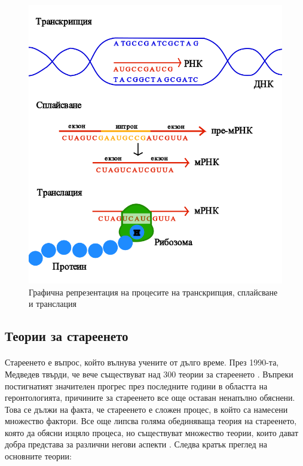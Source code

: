 \documentclass[pdftex,cyrillic,14pt,a4page,twoside]{extreport}
\begin{document}
\begin{figure}[h]
  \centering
  \includegraphics[width=12cm]{figures/transcription_splicing_translation}
  \caption {Графична репрезентация на процесите на транскрипция, сплайсване и транслация}
  \label{fig:transcription_splicing_translation}
\end{figure}

\subsection{Теории за стареенето}
\paragraph{}
Стареенето е въпрос, който вълнува учените от дълго време. През 1990-та, Медведев твърди, че вече съществуват над 300 теории за стареенето \cite{medvedev1990}. Въпреки постигнатият значителен прогрес през последните години в областта на геронтологията, причините за стареенето все още оставан ненапълно обяснени. Това се дължи на факта, че стареенето е сложен процес, в който са намесени множество фактори. Все още липсва голяма обединяваща теория на стареенето, която да обясни изцяло процеса, но съществуват множество теории, които дават добра представа за различни негови аспекти \cite{vina2007}. Следва кратък преглед на основните теории:
\end{document}
